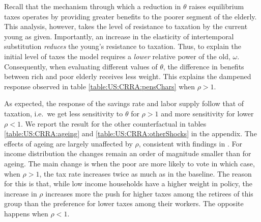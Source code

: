  




Recall that the mechanism through which a reduction in $\theta$ raises equilibrium taxes operates by providing greater benefits to the poorer segment of the elderly. This analysis, however, takes the level of resistance to taxation by the current young as given. Importantly, an increase in the elasticity of intertemporal substitution {\it reduces} the young’s resistance to taxation. Thus, to explain the initial level of taxes the model requires a {\it lower} relative power of the old, $\omega$. Consequently, when evaluating different values of $\theta$, the difference in benefits between rich and poor elderly receives less weight. This explains the dampened response observed in table \ref{table:US:CRRA:pensChars} when $\rho>1$.

As expected, the response of the savings rate and labor supply follow that of taxation, i.e.\ we get less sensitivity to $\theta$ for $\rho>1$ and more sensitivity for lower $\rho<1$. We report the result for the other counterfactual in tables \ref{table:US:CRRA:ageing} and \ref{table:US:CRRA:otherShocks} in the appendix. The effects of ageing are largely unaffected by $\rho$, consistent with findings in \textcite{mkvss08}. For income distribution the changes remain an order of magnitude smaller than for ageing. The main change is when the poor are more likely to vote in which case, when $\rho>1$, the tax rate increases twice as much as in the baseline. The reason for this is that, while low income households have a higher weight in policy, the increase in $\rho$ increases more the push for higher taxes among the retirees of this group than the preference for lower taxes among their workers. The opposite happens when $\rho<1$. 


